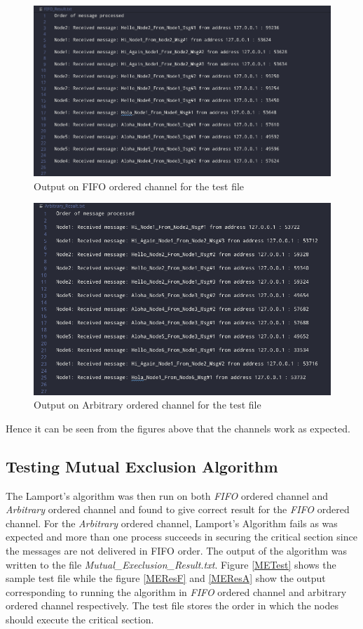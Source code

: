 \documentclass[a4paper, 12pt]{article}
\begin{document}
			\begin{figure}[H]
				\includegraphics[width=\linewidth]{FIFO_Res.png}
				\caption{Output on FIFO ordered channel for the test file}
				\label{FIFORes}
			\end{figure}
		
			\begin{figure}[H]
				\includegraphics[width=\linewidth]{Arbitrary_Res.png}
				\caption{Output on Arbitrary ordered channel for the test file}
				\label{AribraryRes}
			\end{figure}
			
			Hence it can be seen from the figures above that the channels work as expected.
			
		\subsection{Testing Mutual Exclusion Algorithm}
			The Lamport's algorithm was then run on both \textit{FIFO} ordered channel and \textit{Arbitrary} ordered channel and found to give correct result for the \textit{FIFO} ordered channel. For the \textit{Arbitrary} ordered channel, Lamport's Algorithm fails as was expected and more than one process succeeds in securing the critical section since the messages are not delivered in FIFO order. The output of the algorithm was written to the file \textit{Mutual\_Execlusion\_Result.txt}. Figure \ref{METest} shows the sample test file while the figure \ref{MEResF} and \ref{MEResA} show the output corresponding to running the algorithm in \textit{FIFO}  ordered channel and arbitrary ordered channel respectively. The test file stores the order in which the nodes should execute the critical section. 
			
\end{document}
